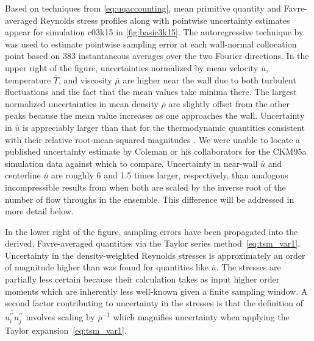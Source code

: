 Based on techniques from \autoref{eq:uqaccounting}, mean primitive quantity and
Favre-averaged Reynolds stress profiles along with pointwise uncertainty
estimates appear for simulation c03k15 in \autoref{fig:basic3k15}.  The
autoregressive technique by \citet{Oliver2014Estimating} was used to estimate
pointwise sampling error at each wall-normal collocation point based on 383
instantaneous averages over the two Fourier directions.  In the upper right of
the figure, uncertainties normalized by mean velocity $\bar{u}$, temperature
$\bar{T}$, and viscosity $\bar{\mu}$ are higher near the wall due to both
turbulent fluctuations and the fact that the mean values take minima there.  The
largest normalized uncertainties in mean density $\bar{\rho}$ are slightly
offset from the other peaks because the mean value increases as one approaches the wall.  Uncertainty
in $\bar{u}$ is appreciably larger than that for the thermodynamic quantities
consistent with their relative root-mean-squared magnitudes \citep[Figures~10
and~18]{Coleman1995Numerical}.
%
We were unable to locate a published uncertainty estimate by Coleman or his
collaborators for the CKM95a simulation data against which to compare.
%
Uncertainty in near-wall $\bar{u}$ and centerline $\bar{u}$ are roughly 6 and
1.5 times larger, respectively, than analogous incompressible results from
\citet{Oliver2014Estimating} when both are scaled by the inverse root of the
number of flow throughs in the ensemble.  This difference will be addressed in
more detail below.

In the lower right of the figure, sampling errors have been propagated into the
derived, Favre-averaged quantities via the Taylor series
method~\eqref{eq:tsm_var1}.  Uncertainty in the density-weighted Reynolds
stresses is approximately an order of magnitude higher than was found for
quantities like $\bar{u}$.  The stresses are partially less certain because
their calculation takes as input higher order moments which are inherently less
well-known given a finite sampling window.  A second factor contributing to
uncertainty in the stresses is that the definition of
$\widetilde{u_i^{\prime\prime}u_j^{\prime\prime}}$ involves scaling by
$\bar{\rho}^{-1}$ which magnifies uncertainty when applying the Taylor
expansion~\eqref{eq:tsm_var1}.

